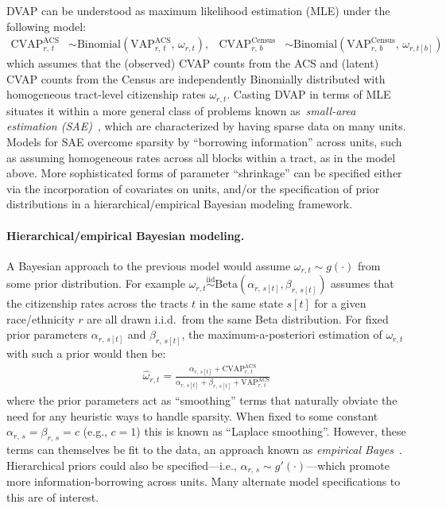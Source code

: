 \documentclass[11pt]{article}
\begin{document}
DVAP can be understood as maximum likelihood estimation (MLE) under the following model:
\begin{align} 
\label{eq:likelihood}
\textrm{CVAP}^{\textrm{ACS}}_{r,\,t} &\sim \textrm{Binomial}\left(\textrm{VAP}^{\textrm{ACS}}_{r,\,t},\, \omega_{r,t}\right), & \textrm{CVAP}^{\textrm{Census}}_{r,\,b} &\sim \textrm{Binomial}\left(\textrm{VAP}^{\textrm{Census}}_{r,\,b},\, \omega_{r,t[b]}\right)
\end{align}
which assumes that the (observed) CVAP counts from the ACS and (latent) CVAP counts from the Census are independently Binomially distributed with homogeneous tract-level citizenship rates $\omega_{r,t}$. Casting DVAP in terms of MLE situates it within a more general class of problems known as~\textit{small-area estimation (SAE)}~\citep{ghosh1994small}, which are characterized by having sparse data on many units. Models for SAE overcome sparsity by ``borrowing information'' across units, such as assuming homogeneous rates across all blocks within a tract, as in the model above. More sophisticated forms of parameter ``shrinkage'' can be specified either via the incorporation of covariates on units, and/or the specification of prior distributions in a hierarchical/empirical Bayesian modeling framework.

\paragraph{Hierarchical/empirical Bayesian modeling.} A Bayesian approach to the previous model would assume $\omega_{r,t} \sim  g(\cdot)$ from some prior distribution. For example $\omega_{r,t} \stackrel{\textrm{iid}}{\sim} \textrm{Beta}(\alpha_{r,\,s[t]}, \beta_{r,\,s[t]})$ assumes that the citizenship rates across the tracts $t$ in the same state $s[t]$ for a given race/ethnicity $r$ are all drawn i.i.d.~from the same Beta distribution. For fixed prior parameters $\alpha_{r,\,s[t]}$ and $\beta_{r,\,s[t]}$, the maximum-a-posteriori estimation of $\omega_{r,t}$ with such a prior would then be:
\begin{align}
\widehat{\omega}_{r, t} = \tfrac{\alpha_{r,\,s[t]} + \textrm{CVAP}^{\textrm{ACS}}_{r,\,t}}{\alpha_{r,\,s[t]} + \beta_{r,\,s[t]} +  \textrm{VAP}^{\textrm{ACS}}_{r,\,t}}
\end{align}
where the prior parameters act as ``smoothing'' terms that naturally obviate the need for any heuristic ways to handle sparsity. When fixed to some constant $\alpha_{r,\,s}=\beta_{r,\,s}=c$ (e.g., $c=1$) this is known as ``Laplace smoothing''. However, these terms can themselves be fit to the data, an approach known as \textit{empirical Bayes}~\citep{efron2019bayes}. Hierarchical priors could also be specified---i.e., $\alpha_{r,\,s} \sim g'(\cdot)$---which promote more information-borrowing across units. Many alternate model specifications to this are of interest.
\end{document}
